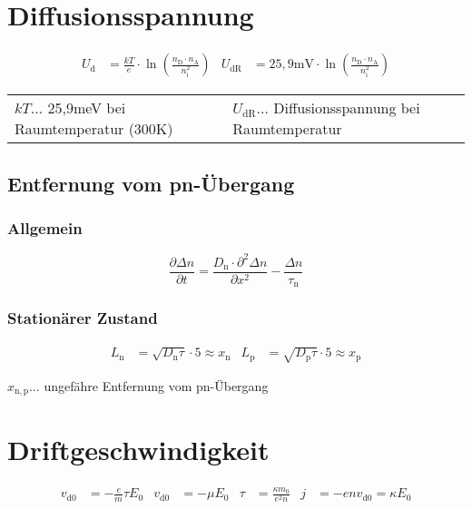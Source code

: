 	\section{Diffusionsspannung}
		\begin{align*}
			U_{\mathrm{d}}&=\frac{kT}{e}\cdot\ln\left(\frac{n_{\mathrm{D}}\cdot n_{\mathrm{A}}}{n_{\mathrm{i}}^2}\right)
			& U_{\mathrm{dR}}&=25,9\mathrm{mV}\cdot\ln\left(\frac{n_{\mathrm{D}}\cdot n_{\mathrm{A}}}{n_{\mathrm{i}}^2}\right)
		\end{align*}
		
		\begin{table}[h]
		\begin{tabular}{ll}
		$kT\dots$ 25,9meV bei Raumtemperatur (300K) & $U_{\mathrm{dR}}\dots$ Diffusionsspannung bei Raumtemperatur\\
		\end{tabular}
		\end{table}

		\subsection{Entfernung vom pn-Übergang}
			\subsubsection{Allgemein}
				\[
					\frac{\partial\Delta n}{\partial t}=\frac{D_{\mathrm{n}}\cdot\partial^2\Delta n}{\partial x^2}-\frac{\Delta n}{\tau_{\mathrm{n}}}
				\]

			\subsubsection{Stationärer Zustand}
				\begin{align*}
					L_{\mathrm{n}}&=\sqrt{D_{\mathrm{n}}\tau}\cdot5\approx x_{\mathrm{n}}
					& L_{\mathrm{p}}&=\sqrt{D_{\mathrm{p}}\tau}\cdot5\approx x_{\mathrm{p}}
				\end{align*}

				$x_{\mathrm{{n,p}}}\dots$ ungefähre Entfernung vom pn-Übergang\\

	\section{Driftgeschwindigkeit}
		\begin{align*}
			v_{\text{d}0} &= -\frac{e}{m}\tau E_0 & v_{\text{d}0} &=-\mu E_0 & \tau &= \frac{\kappa m_0}{e^2n} 
			& j &= -env_{\text{d}0}=\kappa E_0
		\end{align*}

